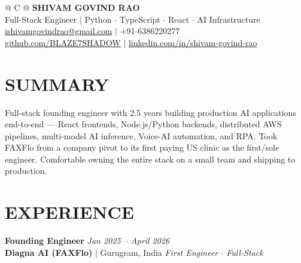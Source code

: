 \documentclass[a4paper,10pt]{article}
\begin{document}
\pagestyle{empty}

\begin{tabularx}{\linewidth}{@{} C @{}}
\Huge{\textbf{SHIVAM GOVIND RAO}} \\[6pt]
\normalsize{Full-Stack Engineer $|$ Python $\cdot$ TypeScript $\cdot$ React $\cdot$ AI Infrastructure} \\[4pt]
\normalsize{\href{mailto:ishivamgovindrao@gmail.com}{ishivamgovindrao@gmail.com} $|$ +91-6386220277} \\
\normalsize{\href{https://github.com/BLAZE7SHADOW}{github.com/BLAZE7SHADOW} $|$ \href{https://www.linkedin.com/in/shivam-govind-rao-138881157/}{linkedin.com/in/shivam-govind-rao}}
\end{tabularx}

\vspace{3pt}

\section{SUMMARY}

Full-stack founding engineer with 2.5 years building production AI applications end-to-end --- React frontends, Node.js/Python backends, distributed AWS pipelines, multi-model AI inference, Voice-AI automation, and RPA. Took FAXFlo from a company pivot to its first paying US clinic as the first/sole engineer. Comfortable owning the entire stack on a small team and shipping to production.

\section{EXPERIENCE}

\textbf{Founding Engineer} \hfill \textit{Jan 2025 -- April 2026}\\
\textbf{Diagna AI (FAXFlo)} $|$ Gurugram, India \hfill \textit{First Engineer $\cdot$ Full-Stack}
\end{document}
